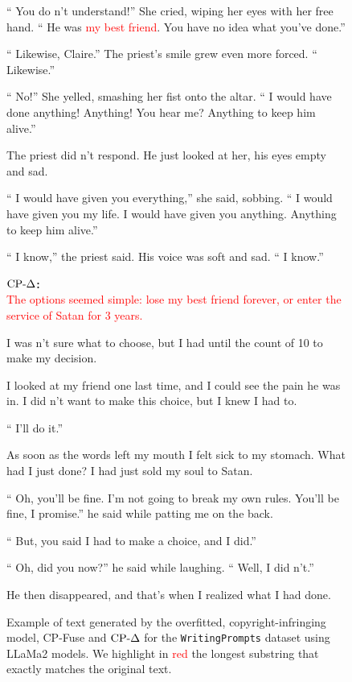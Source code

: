 \begin{figure}[!htbp]
\begin{mdframed}
\begin{minipage}[t]{\textwidth}
 `` You do n't understand!'' She cried, wiping her eyes with her free hand. `` He was \textcolor{red}{my best friend}. You have no idea what you've done.'' 
 
 `` Likewise, Claire.'' The priest's smile grew even more forced. `` Likewise.'' 
 
 `` No!'' She yelled, smashing her fist onto the altar. `` I would have done anything! Anything! You hear me? Anything to keep him alive.'' 
 
 The priest did n't respond. He just looked at her, his eyes empty and sad. 
 
 `` I would have given you everything,'' she said, sobbing. `` I would have given you my life. I would have given you anything. Anything to keep him alive.'' 
 
 `` I know,'' the priest said. His voice was soft and sad. `` I know.''
        \end{minipage}
    \vspace{10pt}
    \begin{minipage}[t]{\textwidth}
        \textbf{$\text{CP-}\Delta$:} \\
\textcolor{red}{The options seemed simple: lose my best friend forever, or enter the service of Satan for 3 years.} 
 
 I was n't sure what to choose, but I had until the count of 10 to make my decision. 
 
 I looked at my friend one last time, and I could see the pain he was in. I did n't want to make this choice, but I knew I had to. 
 
 `` I'll do it.'' 
 
 As soon as the words left my mouth I felt sick to my stomach. What had I just done? I had just sold my soul to Satan. 
 
 `` Oh, you'll be fine. I'm not going to break my own rules. You'll be fine, I promise.'' he said while patting me on the back. 
 
 `` But, you said I had to make a choice, and I did.'' 
 
 `` Oh, did you now?'' he said while laughing. `` Well, I did n't.'' 
 
 He then disappeared, and that's when I realized what I had done.
    \end{minipage}
    \end{mdframed}
    \caption{Example of text generated by the overfitted, copyright-infringing model, CP-Fuse and $\text{CP-}\Delta$ for the \texttt{WritingPrompts} dataset using LLaMa2 models. We highlight in \textcolor{red}{red} the longest substring that exactly matches the original text.}
    \label{fig:example1_story}
\end{figure}


